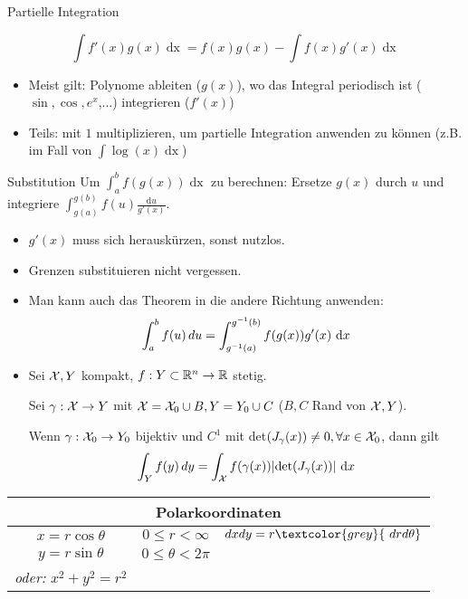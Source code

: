 \begin{mainbox}{Partielle Integration}

  $$\int f'(x) g(x) \mathop{dx} = f(x)g(x) - \int f(x) g'(x) \mathop{dx}$$
\end{mainbox}
\begin{itemize}
  \item Meist gilt: Polynome ableiten ($g(x)$), wo das Integral periodisch ist ($\sin, \cos, e^x$,...) integrieren ($f'(x)$)
  \item Teils: mit $1$ multiplizieren, um partielle Integration anwenden zu können (z.B. im Fall von $\int \log(x) \mathop{dx}$)
\end{itemize}
\begin{mainbox}{Substitution}
  Um $\int_a^b f(g(x)) \mathop{dx}$ zu berechnen: Ersetze $g(x)$ durch $u$ und integriere $\int_{g(a)}^{g(b)} f(u) \frac{\text{d}u}{g'(x)}$.
\end{mainbox}
\begin{itemize}
  \item $g'(x)$ muss sich herauskürzen, sonst nutzlos.
  \item Grenzen substituieren nicht vergessen.
  \item Man kann auch das Theorem in die andere Richtung anwenden: \[\int_a^b f(u) \mathop{du} = \int_{g^{-1}(a)}^{g^{-1}(b)}f(g(x))g'(x) \text{ d}x\]
  \item Sei $\mathcal{X}, Y$ kompakt, $f: Y \subset \mathbb{R}^n \to \mathbb{R}$ stetig.

        Sei $\gamma: \mathcal{X} \to Y$ mit $\mathcal{X} = \mathcal{X}_0 \cup B, Y = Y_0 \cup C$ ($B, C$ Rand von $\mathcal{X}, Y$).

        Wenn $\gamma: \mathcal{X}_0 \to Y_0$ bijektiv und $C^1$ mit det$(J_\gamma(x)) \neq 0, \forall x \in \mathcal{X}_0$, dann gilt
        \[\int_Y f(y)\mathop{dy} = \int_{\mathcal{X}} f(\gamma(x))|\text{det}(J_\gamma(x))|\text{ d}x\]
	\end{itemize}

	
   		
   	\begin{center}
    \newcommand{\specialcell}[2][c]{\begin{tabular}[#1]{@{}c@{}}#2\end{tabular}}
    \renewcommand{\arraystretch}{1}
    \begin{tabular}{|c|c|c|}
		\hline \multicolumn{3}{|c|}{ Polarkoordinaten } \\
		\hline
		$x=r \cos \theta$ & $0 \leq r<\infty$ & $d x d y=r \textcolor{grey}{\ d r d \theta}$ \\
		$y=r \sin \theta$ & $0 \leq \theta<2 \pi$ & \\
		\textit{oder:} $x^2+y^2=r^2$ & &  \\
		
	\hline
	\end{tabular}
	
	
    \end{center}
    
